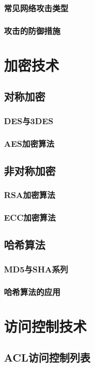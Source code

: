 \documentclass{book}
\begin{document}
\subsubsection{常见网络攻击类型}
\subsubsection{攻击的防御措施}
\section{加密技术}
\subsection{对称加密}
\subsubsection{DES与3DES}
\subsubsection{AES加密算法}
\subsection{非对称加密}
\subsubsection{RSA加密算法}
\subsubsection{ECC加密算法}
\subsection{哈希算法}
\subsubsection{MD5与SHA系列}
\subsubsection{哈希算法的应用}
\section{访问控制技术}
\subsection{ACL访问控制列表}
\end{document}
